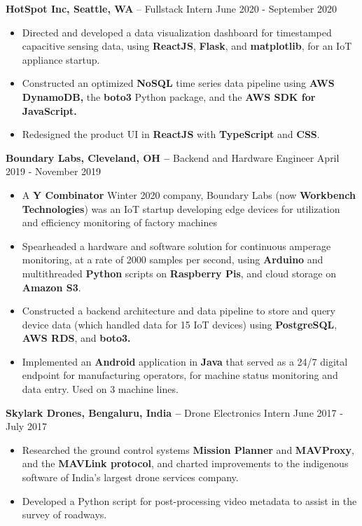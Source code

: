 \documentclass{res}
\begin{document}
\begin{resume}
 {\large{\bf HotSpot Inc, Seattle, WA} – Fullstack Intern   \hfill June 2020 - September 2020}
 \begin{itemize} \itemsep -2pt  %
 \item Directed and developed a data visualization dashboard for timestamped capacitive sensing data, using \textbf{ReactJS}, \textbf{Flask}, and \textbf{matplotlib}, for an IoT appliance startup.
 \item Constructed an optimized \textbf{NoSQL} time series data pipeline using \textbf{AWS DynamoDB,} the \textbf{boto3} Python package, and the \textbf{AWS SDK for JavaScript.}
 \item Redesigned the product UI in \textbf{ReactJS} with \textbf{TypeScript} and \textbf{CSS}.
 \end{itemize}

 {\large{\bf Boundary Labs, Cleveland, OH –} Backend and Hardware Engineer   \hfill April  2019 - November 2019 }
 \begin{itemize} \itemsep -2pt  %
 \item A \textbf{Y Combinator} Winter 2020 company, Boundary Labs (now \textbf{Workbench Technologies}) was an IoT startup developing edge devices for utilization and efficiency monitoring of factory machines 
 \item Spearheaded a hardware and software solution for continuous amperage monitoring, at a rate of 2000 samples per second, using \textbf{Arduino} and multithreaded \textbf{Python} scripts on \textbf{Raspberry Pis}, and cloud storage on \textbf{Amazon S3}.
 \item Constructed a backend architecture and data pipeline to store and query device data (which  handled data for 15 IoT devices) using \textbf{PostgreSQL}, \textbf{AWS RDS}, and  \textbf{boto3.} 
 \item Implemented an \textbf{Android} application in \textbf{Java} that served as a 24/7 digital endpoint for manufacturing operators, for machine status monitoring and data entry. Used on 3 machine lines.
 \end{itemize}

{\large{\bf Skylark Drones, Bengaluru, India –} Drone Electronics Intern  \hfill  June 2017 - July 2017}
\begin{itemize} \itemsep -2pt %
	\item Researched  the ground control systems \textbf{Mission Planner} and \textbf{MAVProxy}, and the \textbf{MAVLink protocol}, and charted improvements to the indigenous software of India's largest drone services company.
	\item Developed a Python script for post-processing video metadata to assist in the survey of roadways.
\end{itemize}


\end{resume}
\end{document}
